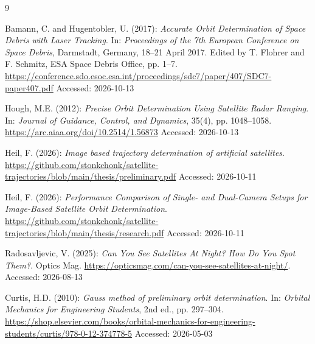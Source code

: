 \documentclass[11pt,a4paper]{article}
\begin{document}
	\newpage
	\begin{thebibliography}{9}
		\setlength{\itemsep}{4pt}       %
		\setlength{\parskip}{0pt}       %
		\setlength{\parsep}{0pt}        %
		
		
		Bamann, C. and Hugentobler, U. (2017):
		\emph{Accurate Orbit Determination of Space Debris with Laser Tracking}.
		In: \emph{Proceedings of the 7th European Conference on Space Debris},
		Darmstadt, Germany, 18--21 April 2017.
		Edited by T. Flohrer and F. Schmitz, ESA Space Debris Office, pp. 1--7.
		\newline
		\url{https://conference.sdo.esoc.esa.int/proceedings/sdc7/paper/407/SDC7-paper407.pdf}
		\newline
		Accessed: 2026-10-13
		
		Hough, M.E. (2012): \emph{Precise Orbit Determination Using Satellite Radar Ranging}.
		In: \emph{Journal of Guidance, Control, and Dynamics}, 35(4), pp. 1048--1058.
		\newline
		\url{https://arc.aiaa.org/doi/10.2514/1.56873}
		\newline
		Accessed: 2026-10-13
		
		
		 Heil, F. (2026): \emph{Image based trajectory determination of artificial satellites}. \newline \url{https://github.com/stonkchonk/satellite-trajectories/blob/main/thesis/preliminary.pdf} \newline Accessed: 2026-10-11
		
		Heil, F. (2026): \emph{Performance Comparison of Single- and Dual-Camera Setups for Image-Based Satellite Orbit Determination}.
		\newline
		\url{https://github.com/stonkchonk/satellite-trajectories/blob/main/thesis/research.pdf}
		\newline
		Accessed: 2026-10-11
		
		Radosavljevic, V. (2025): \emph{Can You See Satellites At Night? How Do You Spot Them?}.
		Optics Mag.
		\url{https://opticsmag.com/can-you-see-satellites-at-night/}.\newline
		Accessed: 2026-08-13
		
		 Curtis, H.D. (2010): \emph{Gauss method of preliminary orbit determination}. In: \emph{Orbital Mechanics for Engineering Students}, 2nd ed., pp. 297--304. \newline \url{https://shop.elsevier.com/books/orbital-mechanics-for-engineering-students/curtis/978-0-12-374778-5} \newline Accessed: 2026-05-03 
	

\end{thebibliography}
\end{document}
